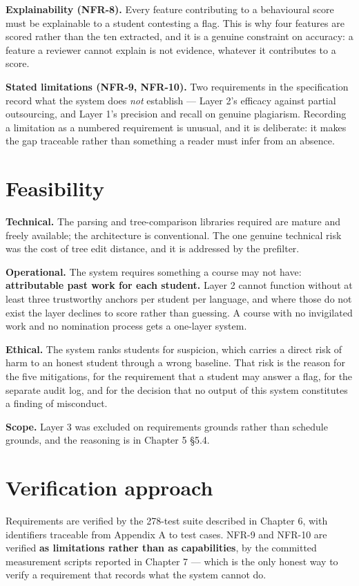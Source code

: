 \textbf{Explainability (NFR-8).} Every feature contributing to a
behavioural score must be explainable to a student contesting a flag.
This is why four features are scored rather than the ten extracted, and
it is a genuine constraint on accuracy: a feature a reviewer cannot
explain is not evidence, whatever it contributes to a score.

\textbf{Stated limitations (NFR-9, NFR-10).} Two requirements in the
specification record what the system does \emph{not} establish --- Layer
2's efficacy against partial outsourcing, and Layer 1's precision and
recall on genuine plagiarism. Recording a limitation as a numbered
requirement is unusual, and it is deliberate: it makes the gap traceable
rather than something a reader must infer from an absence.

\hypertarget{feasibility}{%
\section{Feasibility}\label{feasibility}}

\textbf{Technical.} The parsing and tree-comparison libraries required
are mature and freely available; the architecture is conventional. The
one genuine technical risk was the cost of tree edit distance, and it is
addressed by the prefilter.

\textbf{Operational.} The system requires something a course may not
have: \textbf{attributable past work for each student.} Layer 2 cannot
function without at least three trustworthy anchors per student per
language, and where those do not exist the layer declines to score
rather than guessing. A course with no invigilated work and no
nomination process gets a one-layer system.

\textbf{Ethical.} The system ranks students for suspicion, which carries
a direct risk of harm to an honest student through a wrong baseline.
That risk is the reason for the five mitigations, for the requirement
that a student may answer a flag, for the separate audit log, and for
the decision that no output of this system constitutes a finding of
misconduct.

\textbf{Scope.} Layer 3 was excluded on requirements grounds rather than
schedule grounds, and the reasoning is in Chapter 5 \S{}5.4.

\hypertarget{verification-approach}{%
\section{Verification approach}\label{verification-approach}}

Requirements are verified by the 278-test suite described in Chapter 6,
with identifiers traceable from Appendix A to test cases. NFR-9 and
NFR-10 are verified \textbf{as limitations rather than as capabilities},
by the committed measurement scripts reported in Chapter 7 --- which is
the only honest way to verify a requirement that records what the system
cannot do.

